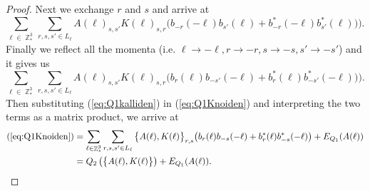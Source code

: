 \documentclass[sn-mathphys,Numbered, a4paper ,nocrop]{sn-jnl}%
\DeclareMathOperator{\Z}{\mathbb{Z}}
\theoremstyle{plain}
\theoremstyle{definition}
\theoremstyle{remark}
\theoremstyle{plain}
\theoremstyle{definition}
\theoremstyle{remark}
\begin{document}
\begin{proof}
Next we exchange $r$ and $s$ and arrive at
\begin{equation}
    \sum\limits_{\ell \in \Z^3_*}\sum\limits_{r,s,s' \in L_{\ell}}A(\ell)_{s,s'}K(\ell)_{s,r}\big(b_{-r}(-\ell)b_{s'}(\ell)+b^*_{-r}(-\ell)b^*_{s'}(\ell) \big)\Big).
\end{equation}
Finally we reflect all the momenta (i.e. $\ell\rightarrow -\ell,r\rightarrow -r,s\rightarrow -s,s'\rightarrow -s'$) and it gives us
\begin{equation}\label{eq:Q1kalliden}
    \sum\limits_{\ell \in \Z^3_*}\sum\limits_{r,s,s' \in L_{\ell}}A(\ell)_{s,s'}K(\ell)_{s,r}\big(b_{r}(\ell)b_{-s'}(-\ell)+b^*_{r}(\ell)b^*_{-s'}(-\ell) \big)\Big).
\end{equation}
Then substituting (\ref{eq:Q1kalliden}) in (\ref{eq:Q1Knoiden}) and interpreting the two terms as a matrix product, we arrive at
\begin{align}
    (\ref{eq:Q1Knoiden}) &= \sum\limits_{\ell \in \Z^3_*}\sum\limits_{r,s,s' \in L_{\ell}}\big\{A(\ell), K(\ell)\big\}_{r,s}\big(b_{r}(\ell)b_{-s}(-\ell)+b^*_{r}(\ell)b^*_{-s}(-\ell)  \big) + E_{Q_1}(A(\ell))\\
    &= Q_2\left(\big\{A(\ell), K(\ell)\big\}\right) + E_{Q_1}(A(\ell)).
\end{align}
\end{proof}
\end{document}
